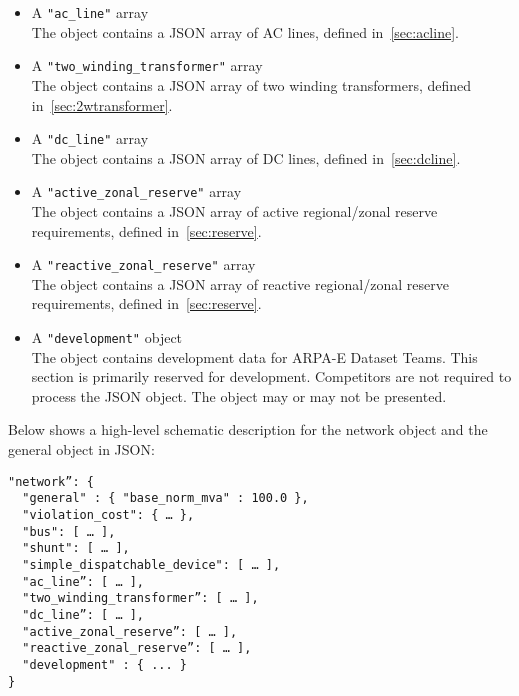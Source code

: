 \begin{itemize}
    \item A \texttt{"ac\_line"} array\\
    The object contains a JSON array of AC lines, defined in~\ref{sec:acline}.
    \item A \texttt{"two\_winding\_transformer"} array\\
    The object contains a JSON array of two winding transformers, defined in~\ref{sec:2wtransformer}.
    \item A \texttt{"dc\_line"} array\\
    The object contains a JSON array of DC lines, defined in~\ref{sec:dcline}.
    \item A \texttt{"active\_zonal\_reserve"} array\\
    The object contains a JSON array of active regional/zonal reserve requirements, defined in~\ref{sec:reserve}.
    \item A \texttt{"reactive\_zonal\_reserve"} array\\
    The object contains a JSON array of reactive regional/zonal reserve requirements, defined in~\ref{sec:reserve}.
    \item A \texttt{"development"} object\\
    The object contains development data for ARPA-E Dataset Teams. This section is primarily reserved for development. Competitors are not required to process the JSON object. The object may or may not be presented. 
\end{itemize}

Below shows a high-level schematic description for the network object and the general object in JSON:
\begin{verbatim}
"network”: {
  "general" : { "base_norm_mva" : 100.0 },
  "violation_cost": { … },
  "bus": [ … ],
  "shunt": [ … ],
  "simple_dispatchable_device": [ … ],
  "ac_line”: [ … ],
  "two_winding_transformer”: [ … ],
  "dc_line”: [ … ],   
  "active_zonal_reserve”: [ … ],
  "reactive_zonal_reserve”: [ … ],
  "development" : { ... }
}    
\end{verbatim}

